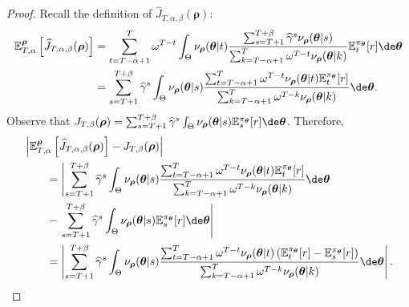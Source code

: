 \begin{proof}
Recall the definition of $\widehat{J}_{T,\alpha,\beta}(\boldsymbol\rho)$:
\begin{align*}
    \mathbb{E}^{\boldsymbol\rho}_{T,\alpha}\left[\widehat{J}_{T,\alpha,\beta}(\boldsymbol\rho)\right] & = \sum_{t=T-\alpha+1}^T \omega^{T-t}  \int_{\Theta} \nu_{\boldsymbol\rho}(\boldsymbol\theta|t) \frac{\sum_{s=T+1}^{T+\beta} \widehat{\gamma}^s \nu_{\boldsymbol\rho}(\boldsymbol\theta|s)}{\sum_{k=T-\alpha+1}^T \omega^{T-t} \nu_{\boldsymbol\rho}(\boldsymbol\theta|k)} \mathbb{E}_t^{\pi_{\boldsymbol\theta}}[r]  \de \boldsymbol\theta \\
    & = \sum_{s=T+1}^{T+\beta} \widehat{\gamma}^s \int_{\Theta}  \nu_{\boldsymbol\rho}(\boldsymbol\theta|s) \frac{\sum_{t=T-\alpha+1}^T \omega^{T-t} \nu_{\boldsymbol\rho}(\boldsymbol\theta|t) \mathbb{E}_t^{\pi_{\boldsymbol\theta}}[r]  }{\sum_{k=T-\alpha+1}^T \omega^{T-k} \nu_{\boldsymbol\rho}(\boldsymbol\theta|k)} \de \boldsymbol\theta.
\end{align*}
Observe that $J_{T,\beta}(\boldsymbol\rho) = \sum_{s=T+1}^{T+\beta} \widehat{\gamma}^s \int_{\Theta} \nu_{\boldsymbol\rho}(\boldsymbol\theta|s) \mathbb{E}_s^{\pi_{\boldsymbol\theta}}[r] \de \boldsymbol\theta$. 
Therefore,
\begin{align*}
    &\left\vert \mathbb{E}^{\boldsymbol\rho}_{T,\alpha}\left[\widehat{J}_{T,\alpha,\beta}(\boldsymbol\rho)\right] - J_{T,\beta}(\boldsymbol\rho)\right\vert 
    \\
    &\qquad =\left| \sum_{s=T+1}^{T+\beta} \widehat{\gamma}^s \int_{\Theta}  \nu_{\boldsymbol\rho}(\boldsymbol\theta|s) \frac{\sum_{t=T-\alpha+1}^T \omega^{T-t} \nu_{\boldsymbol\rho}(\boldsymbol\theta|t) \mathbb{E}_t^{\pi_{\boldsymbol\theta}}[r]  }{\sum_{k=T-\alpha+1}^T \omega^{T-k} \nu_{\boldsymbol\rho}(\boldsymbol\theta|k)} \de \boldsymbol\theta \right.
    \\
    &\qquad - \left.\sum_{s=T+1}^{T+\beta} \widehat{\gamma}^s \int_{\Theta} \nu_{\boldsymbol\rho}(\boldsymbol\theta|s) \mathbb{E}_s^{\pi_{\boldsymbol\theta}}[r] \de \boldsymbol\theta \right| 
    \\
    &\qquad = \left| \sum_{s=T+1}^{T+\beta} \widehat{\gamma}^s \int_{\Theta}  \nu_{\boldsymbol\rho}(\boldsymbol\theta|s) \frac{\sum_{t=T-\alpha+1}^T \omega^{T-t} \nu_{\boldsymbol\rho}(\boldsymbol\theta|t) \left(\mathbb{E}_t^{\pi_{\boldsymbol\theta}}[r] - \mathbb{E}_s^{\pi_{\boldsymbol\theta}}[r] \right) }{\sum_{k=T-\alpha+1}^T \omega^{T-k} \nu_{\boldsymbol\rho}(\boldsymbol\theta|k)} \de \boldsymbol\theta  \right|.
\end{align*}

\end{proof}
